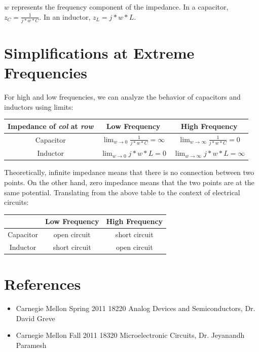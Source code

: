 \documentclass[12pt]{article}
\begin{document}
$w$ represents the frequency component of the impedance. In a capacitor, $z_C = \frac{1}{j*w*C}$. In an inductor, $z_L = j*w*L$.\\


\section{Simplifications at Extreme Frequencies}
For high and low frequencies, we can analyze the behavior of capacitors and inductors using limits:\\

\begin{center}
\begin{tabular}{|c|c|c|}
  \hline
  Impedance of \emph{col} at \emph{row} & Low Frequency & High Frequency\\
  \hline
  Capacitor & $\lim_{w \to 0} \frac{1}{j*w*C} = \infty$ & $\lim_{w \to \infty} \frac{1}{j*w*C} = 0$\\
  \hline
  Inductor & $\lim_{w \to 0} j*w*L = 0$ & $\lim_{w \to \infty} j*w*L = \infty$\\
  \hline
\end{tabular}
\end{center}

Theoretically, infinite impedance means that there is no connection between two points. On the other hand, zero impedance means that the two points are at the same potential. Translating from the above table to the context of electrical circuits:\\

\begin{center}
\begin{tabular}{|c|c|c|}
  \hline
   & Low Frequency & High Frequency\\
  \hline
  Capacitor & open circuit & short circuit\\
  \hline
  Inductor & short circuit & open circuit\\
  \hline
\end{tabular}
\end{center}

\newpage
\section{References}
\begin{itemize}
\item Carnegie Mellon Spring 2011 18220 Analog Devices and Semiconductors, Dr. David Greve
\item Carnegie Mellon Fall 2011 18320 Microelectronic Circuits, Dr. Jeyanandh Paramesh
\end{itemize}
\end{document}
